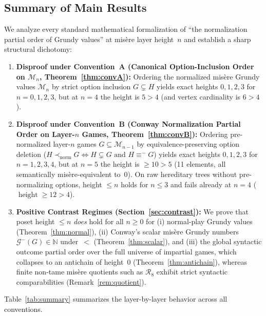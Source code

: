 \documentclass[11pt]{amsart}
\theoremstyle{definition}
\theoremstyle{remark}
\newcommand{\Mlayer}{\mathcal{M}}
\newcommand{\Glayer}{\mathcal{G}}
\DeclareMathOperator{\height}{height}
\begin{document}
\subsection*{Summary of Main Results}
We analyze every standard mathematical formalization of ``the normalization partial order of Grundy values'' at mis\`ere layer height~$n$ and establish a sharp structural dichotomy:
\begin{enumerate}
  \item \textbf{Disproof under Convention~A (Canonical Option-Inclusion Order on $\Mlayer_n$, Theorem~\ref{thm:convA}):} Ordering the normalized mis\`ere Grundy values $\Mlayer_n$ by strict option inclusion $G \subsetneq H$ yields exact heights $0, 1, 2, 3$ for $n = 0, 1, 2, 3$, but at \textbf{$n = 4$} the height is \textbf{$5 > 4$} (and vertex cardinality is $6 > 4$).
  \item \textbf{Disproof under Convention~B (Conway Normalization Partial Order on Layer-$n$ Games, Theorem~\ref{thm:convB}):} Ordering pre-normalized layer-$n$ games $G \subseteq \Mlayer_{n-1}$ by equivalence-preserving option deletion ($H \prec_{\mathrm{norm}} G \iff H \subsetneq G \text{ and } H \equiv^- G$) yields exact heights $0, 1, 2, 3$ for $n = 1, 2, 3, 4$, but at \textbf{$n = 5$} the height is \textbf{$\ge 10 > 5$} (11 elements, all semantically mis\`ere-equivalent to~$0$). On raw hereditary trees without pre-normalizing options, height $\le n$ holds for $n \le 3$ and fails already at $n = 4$ ($\height \ge 12 > 4$).
  \item \textbf{Positive Contrast Regimes (Section~\ref{sec:contrast}):} We prove that poset height $\le n$ \emph{does} hold for all $n \ge 0$ for (i) normal-play Grundy values (Theorem~\ref{thm:normal}), (ii) Conway's scalar mis\`ere Grundy numbers $\Glayer^-(G) \in \mathbb{N}$ under~$<$ (Theorem~\ref{thm:scalar}), and (iii) the global syntactic outcome partial order over the full universe of impartial games, which collapses to an antichain of height~$0$ (Theorem~\ref{thm:antichain}), whereas finite non-tame mis\`ere quotients such as $\mathcal{R}_8$ exhibit strict syntactic comparabilities (Remark~\ref{rem:quotient}).
\end{enumerate}

Table~\ref{tab:summary} summarizes the layer-by-layer behavior across all conventions.
\end{document}
